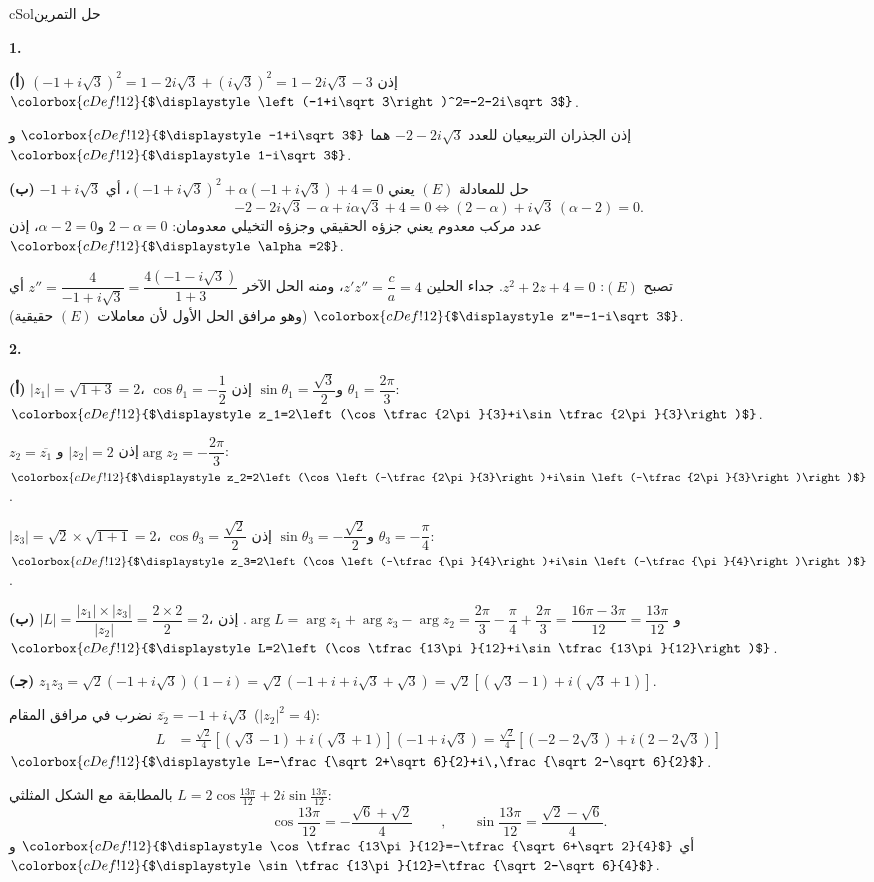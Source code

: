 \documentclass[12pt,a4paper]{article}
\newcounter{exo}
\newenvironment{hal}{\Needspace{12\baselineskip}\begin{otherlanguage}{english}\begin{arbox}[breakable]{cSol}{حل التمرين \theexo}}{\end{arbox}\end{otherlanguage}}
\newcommand{\bx}[1]{\ensuremath{\colorbox{cDef!12}{$\displaystyle #1$}}}
\newcommand{\pa}{\par\smallskip\textbf{(أ)} }\newcommand{\pb}{\par\smallskip\textbf{(ب)} }\newcommand{\pc}{\par\smallskip\textbf{(جـ)} }\newcommand{\pd}{\par\smallskip\textbf{(د)} }\newcommand{\pe}{\par\smallskip\textbf{(هـ)} }
\newcommand{\QQ}[1]{\par\smallskip\textbf{#1.} }
\begin{document}
\begin{hal}
\QQ{1}
\pa $\left(-1+i\sqrt3\right)^2=1-2i\sqrt3+\left(i\sqrt3\right)^2=1-2i\sqrt3-3$ إذن \bx{\left(-1+i\sqrt3\right)^2=-2-2i\sqrt3}.

إذن الجذران التربيعيان للعدد $-2-2i\sqrt3$ هما \bx{-1+i\sqrt3} و\bx{1-i\sqrt3}.

\pb $-1+i\sqrt3$ حل للمعادلة $(E)$ يعني $\left(-1+i\sqrt3\right)^2+\alpha\left(-1+i\sqrt3\right)+4=0$، أي
\[-2-2i\sqrt3-\alpha+i\alpha\sqrt3+4=0\iff(2-\alpha)+i\sqrt3\,(\alpha-2)=0 .\]
عدد مركب معدوم يعني جزؤه الحقيقي وجزؤه التخيلي معدومان: $2-\alpha=0$ و$\alpha-2=0$، إذن \bx{\alpha=2}.

تصبح $(E)$: $z^2+2z+4=0$. جداء الحلين $z'z''=\dfrac{c}{a}=4$، ومنه الحل الآخر
$z''=\dfrac{4}{-1+i\sqrt3}=\dfrac{4\left(-1-i\sqrt3\right)}{1+3}$ أي \bx{z''=-1-i\sqrt3}
(وهو مرافق الحل الأول لأن معاملات $(E)$ حقيقية).

\QQ{2}
\pa $|z_1|=\sqrt{1+3}=2$، $\cos\theta_1=-\dfrac12$ و$\sin\theta_1=\dfrac{\sqrt3}{2}$ إذن $\theta_1=\dfrac{2\pi}{3}$:
\bx{z_1=2\left(\cos\tfrac{2\pi}{3}+i\sin\tfrac{2\pi}{3}\right)}.

$z_2=\overline{z_1}$ إذن $|z_2|=2$ و$\arg z_2=-\dfrac{2\pi}{3}$:
\bx{z_2=2\left(\cos\left(-\tfrac{2\pi}{3}\right)+i\sin\left(-\tfrac{2\pi}{3}\right)\right)}.

$|z_3|=\sqrt2\times\sqrt{1+1}=2$، $\cos\theta_3=\dfrac{\sqrt2}{2}$ و$\sin\theta_3=-\dfrac{\sqrt2}{2}$ إذن $\theta_3=-\dfrac{\pi}{4}$:
\bx{z_3=2\left(\cos\left(-\tfrac{\pi}{4}\right)+i\sin\left(-\tfrac{\pi}{4}\right)\right)}.

\pb $|L|=\dfrac{|z_1|\times|z_3|}{|z_2|}=\dfrac{2\times2}{2}=2$، و
$\arg L=\arg z_1+\arg z_3-\arg z_2=\dfrac{2\pi}{3}-\dfrac{\pi}{4}+\dfrac{2\pi}{3}=\dfrac{16\pi-3\pi}{12}=\dfrac{13\pi}{12}$.
إذن \bx{L=2\left(\cos\tfrac{13\pi}{12}+i\sin\tfrac{13\pi}{12}\right)}.

\pc $z_1z_3=\sqrt2\left(-1+i\sqrt3\right)(1-i)=\sqrt2\left(-1+i+i\sqrt3+\sqrt3\right)=\sqrt2\left[\left(\sqrt3-1\right)+i\left(\sqrt3+1\right)\right]$.

نضرب في مرافق المقام $\overline{z_2}=-1+i\sqrt3$ ($|z_2|^2=4$):
\begin{align*}
L&=\frac{\sqrt2}{4}\left[\left(\sqrt3-1\right)+i\left(\sqrt3+1\right)\right]\left(-1+i\sqrt3\right)
=\frac{\sqrt2}{4}\left[\left(-2-2\sqrt3\right)+i\left(2-2\sqrt3\right)\right]
\end{align*}
\bx{L=-\frac{\sqrt2+\sqrt6}{2}+i\,\frac{\sqrt2-\sqrt6}{2}}.

بالمطابقة مع الشكل المثلثي $L=2\cos\tfrac{13\pi}{12}+2i\sin\tfrac{13\pi}{12}$:
\[\cos\frac{13\pi}{12}=-\frac{\sqrt6+\sqrt2}{4}\qquad\text{,}\qquad \sin\frac{13\pi}{12}=\frac{\sqrt2-\sqrt6}{4}.\]
أي \bx{\cos\tfrac{13\pi}{12}=-\tfrac{\sqrt6+\sqrt2}{4}} و\bx{\sin\tfrac{13\pi}{12}=\tfrac{\sqrt2-\sqrt6}{4}}.
\end{hal}
\end{document}
